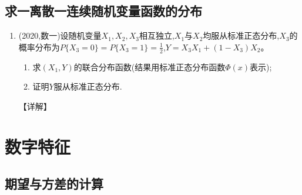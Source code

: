 \documentclass[12pt, a4paper, oneside, UTF8]{ctexbook}
\begin{document}
\subsection{求一离散一连续随机变量函数的分布}

\begin{enumerate}[label=\arabic*.,start=14]
    \item  (2020,数一)设随机变量$X_1,X_2,X_3$相互独立,$X_1$与$X_2$均服从标准正态分布,$X_3$的概率分布为$P\{X_3=0\}=P\{X_3=1\}=\frac{1}{2}$,$Y=X_3X_1+(1-X_3)X_2$。
    \begin{enumerate}
        \item 求$(X_1,Y)$的联合分布函数(结果用标准正态分布函数$\Phi(x)$表示);
        \item 证明$Y$服从标准正态分布.
    \end{enumerate}
    
    \begin{solution}
    【详解】
    \end{solution}
\end{enumerate}

\section{数字特征}

\subsection{期望与方差的计算}
\end{document}
